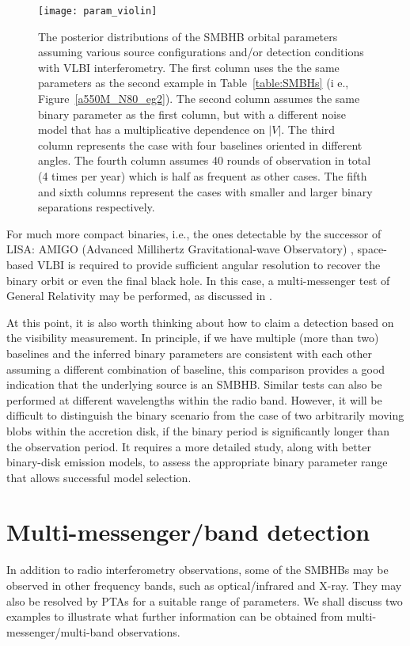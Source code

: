 \documentclass[twocolumn]{aastex62}
\begin{document}
%
\begin{figure}[t!] %
\centering 
\texttt{[image: param\_violin]} 
\caption{The posterior distributions of the SMBHB orbital parameters assuming various source configurations and/or detection conditions with VLBI interferometry. The first column uses the the same parameters as the second example in Table~\ref{table:SMBHs} (i e., Figure~\ref{a550M_N80_eg2}). The second column  assumes the same binary parameter as the first column, but with a different noise model that  has a multiplicative dependence on $|V|$. The third column represents the case with four baselines oriented in different angles.
The fourth column assumes 40 rounds of observation in total (4 times per year) which is half as frequent as other cases.
 The fifth and sixth columns represent the cases with smaller and larger binary separations respectively.      }
\label{param_violin_plot}
\end{figure} 


For much more compact binaries, i.e., the ones detectable by the successor of LISA: AMIGO (Advanced Millihertz Gravitational-wave Observatory) \citep{Baibhav:2019rsa}, space-based VLBI is required to provide sufficient angular resolution to recover the binary orbit or even the final black hole. In this case, a multi-messenger test of General Relativity may be performed, as discussed in  \citep{Yang:2021zqy}. 

At this point, it is also worth thinking about how to claim a detection based on the visibility measurement. In principle, if we have multiple (more than two) baselines and the inferred binary parameters are consistent with each other assuming a different combination of baseline, this comparison provides a good indication that the underlying source is an SMBHB. Similar tests can also be performed at different wavelengths within the radio band. However, it will be difficult to distinguish the binary scenario from the case of two arbitrarily moving blobs within the accretion disk, if the binary period is significantly longer than the observation period. It requires a more detailed study, along with better binary-disk emission models, to assess the appropriate binary parameter range that allows successful model selection. 

\section{Multi-messenger/band detection} 
\label{discuss}

In addition to radio interferometry observations, some of the SMBHBs may be observed in other frequency bands, such as optical/infrared and X-ray. They may also be resolved by PTAs for a suitable range of parameters. We shall discuss two examples to illustrate what further information can be obtained from  multi-messenger/multi-band observations. 
\end{document}
